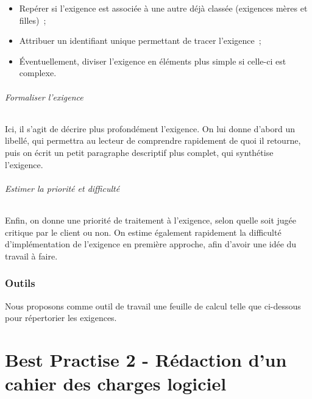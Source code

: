 \begin{itemize}
\item Repérer si l’exigence est associée à une autre déjà classée (exigences mères et filles) ;
\item Attribuer un identifiant unique permettant de tracer l’exigence ;
\item Éventuellement, diviser l’exigence en éléments plus simple si celle-ci est complexe.
\end{itemize}

\paragraph{Formaliser l’exigence}
Ici, il s’agit de décrire plus profondément l’exigence. On lui donne d’abord un libellé, qui permettra au lecteur de comprendre rapidement de quoi il retourne, puis on écrit un petit paragraphe descriptif plus complet, qui synthétise l’exigence.


\paragraph{Estimer la priorité et difficulté}
Enfin, on donne une priorité de traitement à l’exigence, selon quelle soit jugée critique par le client ou non.  On estime également rapidement la difficulté d’implémentation de l’exigence en première approche, afin d’avoir une idée du travail à faire.

\section{Outils}

Nous proposons comme outil de travail une feuille de calcul telle que ci-dessous pour répertorier les exigences.

\part{Best Practise 2 - Rédaction d'un cahier des charges logiciel}

